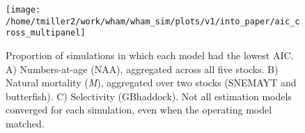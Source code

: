 \documentclass[]{article}
\begin{document}
\pagebreak

\begin{figure}

{\centering \texttt{[image: /home/tmiller2/work/wham/wham\_sim/plots/v1/into\_paper/aic\_cross\_multipanel]} 

}

\caption{Proportion of simulations in which each model had the lowest AIC. A) Numbers-at-age (NAA), aggregated across all five stocks. B) Natural mortality (\textit{M}), aggregated over two stocks (SNEMAYT and butterfish). C) Selectivity (GBhaddock). Not all estimation models converged for each simulation, even when the operating model matched.}\label{fig:aic-cross}
\end{figure}
\end{document}
